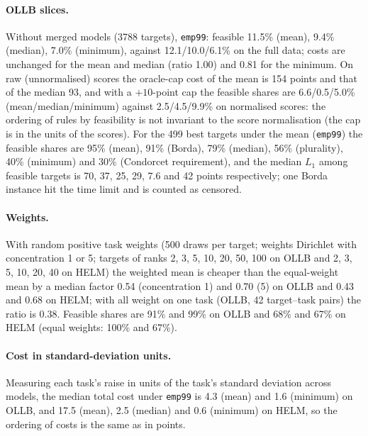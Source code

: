 \documentclass{article}
\begin{document}
\paragraph{OLLB slices.} Without merged models (3788 targets), \texttt{emp99}: feasible 11.5\% (mean), 9.4\% (median), 7.0\% (minimum), against 12.1/10.0/6.1\% on the full data; costs are unchanged for the mean and median (ratio 1.00) and 0.81 for the minimum. On raw (unnormalised) scores the oracle-cap cost of the mean is 154 points and that of the median 93, and with a $+10$-point cap the feasible shares are 6.6/0.5/5.0\% (mean/median/minimum) against 2.5/4.5/9.9\% on normalised scores: the ordering of rules by feasibility is not invariant to the score normalisation (the cap is in the units of the scores). For the 499 best targets under the mean (\texttt{emp99}) the feasible shares are 95\% (mean), 91\% (Borda), 79\% (median), 56\% (plurality), 40\% (minimum) and 30\% (Condorcet requirement), and the median $L_1$ among feasible targets is 70, 37, 25, 29, 7.6 and 42 points respectively; one Borda instance hit the time limit and is counted as censored.

\paragraph{Weights.} With random positive task weights (500 draws per target; weights Dirichlet with concentration 1 or 5; targets of ranks 2, 3, 5, 10, 20, 50, 100 on OLLB and 2, 3, 5, 10, 20, 40 on HELM) the weighted mean is cheaper than the equal-weight mean by a median factor 0.54 (concentration 1) and 0.70 (5) on OLLB and 0.43 and 0.68 on HELM; with all weight on one task (OLLB, 42 target--task pairs) the ratio is 0.38. Feasible shares are 91\% and 99\% on OLLB and 68\% and 67\% on HELM (equal weights: 100\% and 67\%).

\paragraph{Cost in standard-deviation units.} Measuring each task's raise in units of the task's standard deviation across models, the median total cost under \texttt{emp99} is 4.3 (mean) and 1.6 (minimum) on OLLB, and 17.5 (mean), 2.5 (median) and 0.6 (minimum) on HELM, so the ordering of costs is the same as in points.

\begin{table}[h]
\caption{Sensitivity of the primary results (OLLB, cap \texttt{emp99}; HELM, \texttt{emp99T}): share of targets that can reach first place under the variant and under the baseline, median $L_1$ among feasible targets, and median ratio of $L_1$ to the baseline on targets feasible under both (paired $n$). For random weights $n$ counts targets $\times$ weight draws at stratified ranks, so shares are not population fractions. Generated by \texttt{figures/src/tables.py} from \texttt{results/summary/summary\_variants.csv}.}
\label{tab:T5}
\centering\scriptsize
\resizebox{\linewidth}{!}{}\\[4pt]
\resizebox{\linewidth}{!}{}
\end{table}
\end{document}
